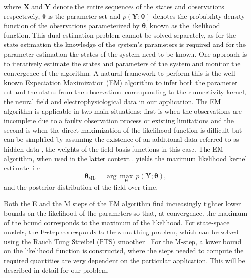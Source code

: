 \documentclass[review,authoryear,3p]{elsarticle}
\begin{document}
where $\mathbf X$ and $\mathbf Y$ denote the entire sequences of the states and observations respectively, $\boldsymbol\theta$ is the parameter set and $p(\mathbf Y;\boldsymbol\theta)$ denotes the probability density function of the observations parameterized  by $\boldsymbol\theta$, known as the likelihood function. This dual estimation problem cannot be solved separately, as for the state estimation the knowledge of the system's parameters is required and for the parameter estimation the states of the system need to be known. One approach is to iteratively estimate the states and parameters of the system and monitor the convergence of the algorithm. A natural framework to perform this is the well known Expectation Maximization (EM) algorithm \citep{Dempster1977,Shumway2000} to infer both the parameter set and the states from the observations corresponding to the connectivity kernel, the neural field and electrophysiological data in our application. The EM algorithm is applicable  in two main situations:  first is when the observations are incomplete due to a faulty observation process or existing limitations and the second is when the direct maximization of the likelihood function is difficult but can be simplified by assuming the existence of an additional data referred to as hidden data \citep{Bilmes1998}, the weights of the field basis functions in this case. The EM algorithm, when used in the latter context \citep{Dewar2009}, yields the maximum likelihood kernel estimate, i.e.
\begin{equation}
	\boldsymbol\theta_{\text{ML}}=\arg\max_{\boldsymbol\theta}~p(\mathbf Y;\boldsymbol\theta),
 \end{equation}   
and the posterior distribution of the field over time.

Both the E and the M steps of the EM algorithm find increasingly tighter lower bounds on the likelihood of the parameters so that, at convergence, the maximum of the bound corresponds to the maximum of the likelihood. For state-space models, the E-step corresponds to the smoothing problem, which can be solved using the Rauch Tung Streibel (RTS) smoother \cite{RAUCH1965}. For the M-step, a lower bound on the likelihood function is constructed, where the steps needed
to compute the required quantities are very dependent on the particular application. This will be described in detail for our problem. 
\end{document}
